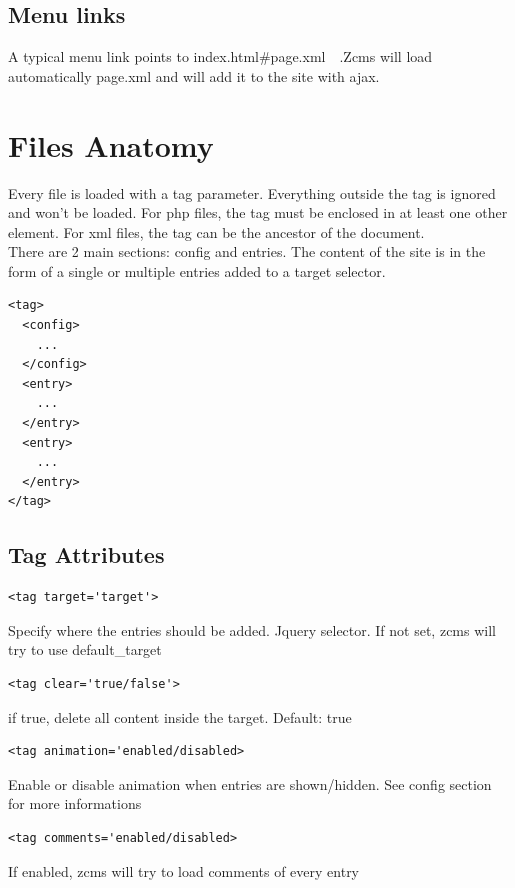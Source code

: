 \documentclass[a4paper,12pt]{article}
\begin{document}
\subsection{Menu links}
A typical menu link points to index.html\#page.xml\ \ .Zcms will load automatically page.xml and will add it to the site with ajax.
\section{Files Anatomy}
Every file is loaded with a tag parameter. Everything outside the tag is ignored and won't be loaded. For php files, the tag must be enclosed in at least one other element. For xml files, the tag can be the ancestor of the document.\\
There are 2 main sections: config and entries. The content of the site is in the form of a single or multiple entries added to a target selector.\\
\footnotesize
\begin{verbatim}
<tag>
  <config>
    ...
  </config>
  <entry>
    ...
  </entry>
  <entry>
    ...
  </entry>
</tag>
\end{verbatim}
\normalsize
\subsection{Tag Attributes}
\begin{list}{-}{}
\item \begin{verbatim}
<tag target='target'>
      \end{verbatim}
Specify where the entries should be added. Jquery selector. If not set, zcms will try to use default\_target
\item \begin{verbatim}
<tag clear='true/false'>
      \end{verbatim}
if true, delete all content inside the target. Default: true
\item \begin{verbatim}
<tag animation='enabled/disabled>
      \end{verbatim}
Enable or disable animation when entries are shown/hidden. See config section for more informations
\item \begin{verbatim}
<tag comments='enabled/disabled>
      \end{verbatim}
If enabled, zcms will try to load comments of every entry
\end{list}
\end{document}

